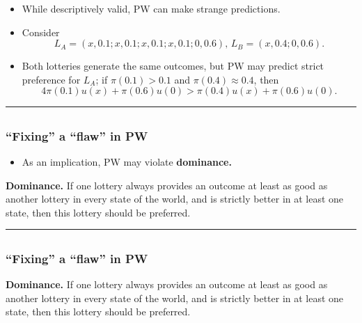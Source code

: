 \documentclass[
  letterpaper,
  DIV=11,
  numbers=noendperiod]{scrartcl}
\providecommand{\tightlist}{%
  \setlength{\itemsep}{0pt}\setlength{\parskip}{0pt}}\usepackage{longtable,booktabs,array}
\begin{document}
\begin{itemize}
\tightlist
\item
  While descriptively valid, PW can make strange predictions.
\item
  Consider \[
  L_A = (x, 0.1;x, 0.1;x, 0.1;x, 0.1; 0, 0.6),\, 
  L_B = (x, 0.4; 0, 0.6).
  \]
\item
  Both lotteries generate the same outcomes, but PW may predict strict
  preference for \(L_A\); if \(\pi(0.1) > 0.1\) and
  \(\pi(0.4)\approx 0.4\), then \[
  4\pi(0.1)u(x) + \pi(0.6)u(0) > \pi(0.4)u(x) + \pi(0.6)u(0).
  \]
\end{itemize}

\begin{center}\rule{0.5\linewidth}{0.5pt}\end{center}

\subsection{}\label{section-5}

\subsubsection{``Fixing'' a ``flaw'' in PW}\label{fixing-a-flaw-in-pw-1}

\begin{itemize}
\tightlist
\item
  As an implication, PW may violate \textbf{dominance.}
\end{itemize}

\textbf{Dominance.} If one lottery always provides an outcome at least
as good as another lottery in every state of the world, and is strictly
better in at least one state, then this lottery should be preferred.

\begin{center}\rule{0.5\linewidth}{0.5pt}\end{center}

\subsection{}\label{section-6}

\subsubsection{``Fixing'' a ``flaw'' in PW}\label{fixing-a-flaw-in-pw-2}

\textbf{Dominance.} If one lottery always provides an outcome at least
as good as another lottery in every state of the world, and is strictly
better in at least one state, then this lottery should be preferred.
\end{document}
